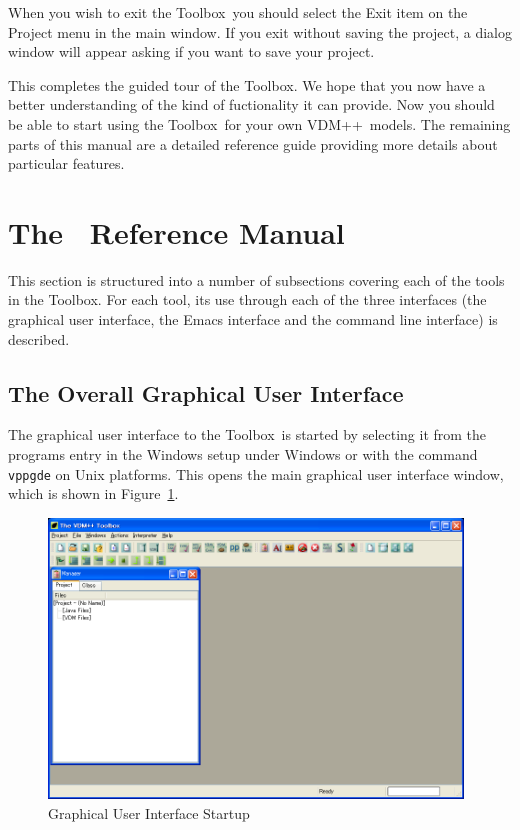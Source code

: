 \documentclass[\pformat,12pt]{article}
\newcommand{\vdmslpp}{VDM++}
\newcommand{\Toolbox}{Toolbox}
\newcommand{\vdmgde}{vppgde}
\newcommand{\guicmd}[1]{{\sf #1}}
\begin{document}
When you wish to exit the \Toolbox\ you should select the
\guicmd{Exit} item on the \guicmd{Project} menu in
the main window. If you exit without saving the project, a dialog
window will appear asking if you want to save your project.

This completes the guided tour of the \Toolbox. We hope that you now have
a better understanding of the kind of fuctionality it can provide. Now
you should be able to start using the \Toolbox\ for your own
\vdmslpp\ models. The remaining parts of this manual are a detailed
reference guide providing more details about particular features.


\newpage
\section{The \protect\VDMTools\ Reference Manual}\label{sec:ref}

This section is structured into a number of subsections covering each
of the tools in the \Toolbox. For each tool, its use through each of
the three interfaces (the graphical user interface, the Emacs
interface and the command line interface) is described.


\subsection{The Overall Graphical User Interface}\label{sec:GUI}

The graphical user interface to the \Toolbox\ is started by selecting
it from the programs entry in the Windows setup under Windows or with
the command {\tt \vdmgde} on Unix platforms.
This opens the main graphical user interface window, which is shown in 
Figure~\ref{fig:startgui2}. 


\begin{figure}[tbh]
\begin{center}
\includegraphics[width=11cm]{startgui-ppENG.png}
\caption{Graphical User Interface Startup}
\label{fig:startgui2}
\end{center}
\end{figure}
\end{document}
